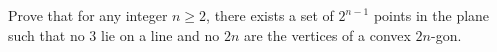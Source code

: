 Prove that for any integer $n \geq 2$, there exists a set of $2^{n-1}$ points in the plane such that no $3$ lie on a line and no $2n$ are the vertices of a convex $2n$-gon.
